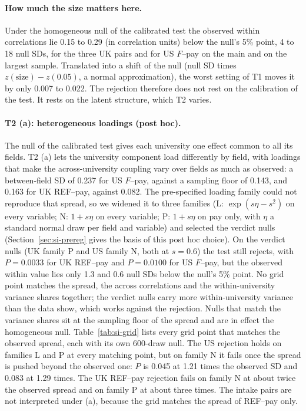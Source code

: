 \documentclass[11pt]{article}
\begin{document}
\paragraph{How much the size matters here.} Under the homogeneous null of the calibrated test the observed within
correlations lie
0.15 to 0.29 (in correlation units) below the null's 5\% point, 4 to 18 null SDs, for the three UK pairs and for US
$F$--pay on the main and on the largest sample. Translated into a shift of the null (null SD times $z(\text{size})-
z(0.05)$, a normal approximation), the worst setting of T1 moves it by only 0.007 to 0.022. The rejection therefore
does not rest on the calibration of the test. It rests on the latent structure, which T2 varies.

\paragraph{T2 (a): heterogeneous loadings (post hoc).} The null of the calibrated test gives each university one
effect common to all its fields. T2 (a) lets the university component load differently by field, with loadings that
make the across-university coupling vary over fields as much as observed: a between-field SD of 0.237 for US
$F$--pay, against a sampling floor of 0.143, and 0.163 for UK REF--pay, against 0.082. The pre-specified loading
family could not reproduce that spread, so we widened it to three families (L: $\exp(s\eta-s^2)$ on every variable;
N: $1+s\eta$ on every variable; P: $1+s\eta$ on pay only, with $\eta$ a standard normal draw per field and variable)
and selected the verdict nulls (Section~\ref{sec:si-prereg} gives the basis of this post hoc choice). On the
verdict nulls (UK family P and US family N, both at $s=0.6$) the test
still rejects, with $P=0.0033$ for UK REF--pay and $P=0.0100$ for US $F$--pay, but the observed within value lies only
1.3 and 0.6 null SDs below the null's 5\% point. No grid point matches the spread, the across correlations and the
within-university variance shares together; the verdict nulls carry more within-university variance than the data
show, which works against the rejection. Nulls that match the variance shares sit at the sampling floor of the spread
and are in effect the homogeneous null. Table~\ref{tab:si-grid} lists every grid point that matches the observed
spread, each with its own 600-draw null. The US rejection holds on families L and P at every matching point, but on
family N it fails once the spread is pushed beyond the observed one: $P$ is 0.045 at 1.21 times the observed SD and
0.083 at 1.29 times. The UK REF--pay rejection fails on family N at about twice the observed spread and on family P at
about three times. The intake pairs are not interpreted under (a), because the grid matches the spread of REF--pay
only.
\end{document}
